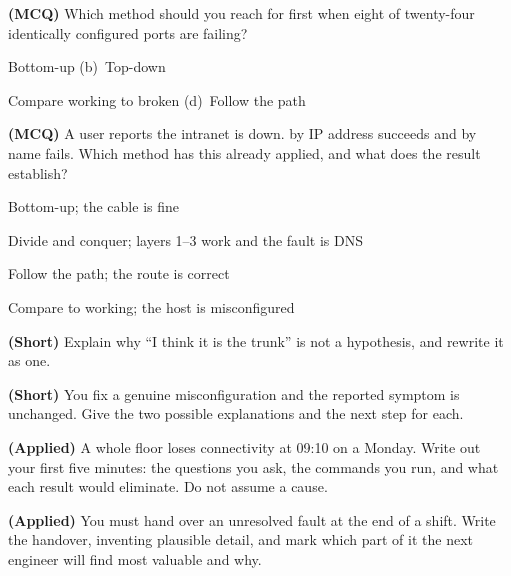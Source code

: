 \begin{reviewq}
  \item \textbf{(MCQ)} Which method should you reach for first when eight of
        twenty-four identically configured ports are failing?
        \begin{tight}
          \item[(a)] Bottom-up \quad (b)~Top-down
          \item[(c)] Compare working to broken \quad (d)~Follow the path
        \end{tight}
  \item \textbf{(MCQ)} A user reports the intranet is down.  by IP
        address succeeds and by name fails. Which method has this already
        applied, and what does the result establish?
        \begin{tight}
          \item[(a)] Bottom-up; the cable is fine
          \item[(b)] Divide and conquer; layers 1--3 work and the fault is DNS
          \item[(c)] Follow the path; the route is correct
          \item[(d)] Compare to working; the host is misconfigured
        \end{tight}
  \item \textbf{(Short)} Explain why ``I think it is the trunk'' is not a
        hypothesis, and rewrite it as one.
  \item \textbf{(Short)} You fix a genuine misconfiguration and the reported
        symptom is unchanged. Give the two possible explanations and the next
        step for each.
  \item \textbf{(Applied)} A whole floor loses connectivity at 09:10 on a Monday.
        Write out your first five minutes: the questions you ask, the commands
        you run, and what each result would eliminate. Do not assume a cause.
  \item \textbf{(Applied)} You must hand over an unresolved fault at the end of a
        shift. Write the handover, inventing plausible detail, and mark which
        part of it the next engineer will find most valuable and why.
\end{reviewq}

